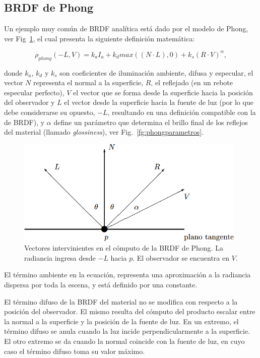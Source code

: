 \subsection{BRDF de Phong}
Un ejemplo muy común de BRDF analítica está dado por el modelo de Phong, ver Fig~\ref{fg:phongVecs}, el cual presenta la siguiente definición matemática:

$$\rho_{phong}(-L,V) =  k_{a} I_{a} + k_{d} max((N \cdot L),0) + k_{s} (R \cdot V)^{\alpha},$$

donde $k_{a}$, $k_{d}$ y $k_{s}$ son coeficientes de iluminación ambiente, difusa y especular, el vector $N$ representa el normal a la superficie, $R$, el reflejado (en un rebote especular perfecto), $V$ el vector que se forma desde la superficie hacia la posición del observador y $L$ el vector desde la superficie hacia la fuente de luz (por lo que debe considerarse su opuesto, $-L$, resultando en una definición compatible con la de BRDF), y $\alpha$ define un parámetro que determina el brillo final de los reflejos del material (llamado {\em glossiness}), ver Fig.~\ref{fg:phongparametros}.


\begin{figure}
\center
\includegraphics[width=11cm]{figures/phongVecs}
\caption[Vectores intervinientes en el cómputo de la BRDF de Phong]{Vectores intervinientes en el cómputo de la BRDF de Phong. La radiancia ingresa desde $-L$ hacia $p$. El observador se encuentra en $V$.}
\label{fg:phongVecs}
\end{figure}

El término ambiente en la ecuación, representa una aproximación a la radiancia dispersa por toda la escena, y está definido por una constante.

El término difuso de la BRDF del material no se modifica con respecto a la posición del observador.
El mismo resulta del cómputo del producto escalar entre la normal a la superficie y la posición de la fuente de luz.
En un extremo, el término difuso se anula cuando la luz incide perpendicularmente a la superficie.
El otro extremo se da cuando la normal coincide con la fuente de luz, en cuyo caso el término difuso toma su valor máximo.

